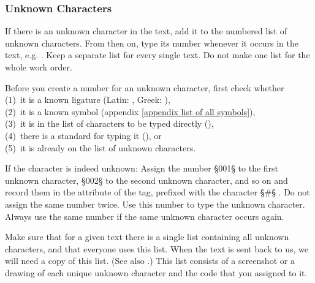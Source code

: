 \subsubsection{Unknown Characters}
\label{section unknown characters}

\begin{mainrule}
If there is an unknown character in the text, add it to the numbered
list of unknown characters. From then on, type its number whenever it
occurs in the text, e.g. . Keep a separate list for every
single text. Do not make one list for the whole work order.
\end{mainrule}

\begin{clarification}
Before you create a number for an unknown character, first check whether \\
(1)~it is a known ligature (Latin: , Greek: ), \\
(2)~it is a known symbol (appendix \ref{appendix list of all symbols}), \\
(3)~it is in the list of characters to be typed directly (), \\
(4)~there is a standard for typing it (), or \\
(5)~it is already on the list of unknown characters.
 \end{clarification}

\begin{clarification}
If the character is indeed unknown: Assign the number §001§ to the first unknown character, §002§ to the second unknown character, and so on and record them in the  attribute of the  tag, prefixed with the character §#§ . Do not assign the same number twice. Use this number to type the unknown character. Always use the same number if the same unknown character occurs again.
\end{clarification}

\begin{note}
Make sure that for a given text there is a single list containing all unknown characters, and that everyone uses this list. When the text is sent back to us, we will need a copy of this list. (See also .) This list consists of a screenshot or a drawing of each unique unknown character and the code that you assigned to it.
\end{note}

